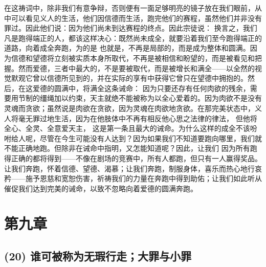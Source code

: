 在这祷词中，除非我们有意争辩，否则便有一面足够明亮的镜子放在我们眼前，从中可以看见义人的生活，他们因信德而生活，跑完他们的赛程，虽然他们并非没有罪过。因此他们说：因为他们尚未到达赛程的终点。因此宗徒说： 换言之，我们凡是跑得端正的人，都该这样决心：既然尚未成全，就要沿着我们至今跑得端正的道路，向着成全奔跑，为的是 也就是，不再是局部的，而是成为整体和圆满。因为信德和望德将立刻被实质本身所取代，不再是被相信和盼望的，而是被看见和把握。然而爱德，三者中最大的，不是要被取代，而是被增长和满全——以全然的视觉默观它曾以信德所见到的，并在实际的享有中获得它曾只在望德中拥抱的。然后，在这爱德的圆满中，将满全这条诫命： 因为只要还存有任何肉欲的残余，需要用节制的缰绳加以约束，天主就绝不能被称为以全心爱着的。因为肉欲不是没有灵魂而贪欲；虽然说是肉欲在贪欲，因为灵魂在肉欲地贪欲。在那完美状态中，义人将毫无罪过地生活，因为在他肢体中不再有相反他心思之法律的律法， 但他将全心、全灵、全意爱天主， 这是第一条且最大的诫命。为什么这样的成全不该吩咐给人呢，尽管在今生可能没有人达到？因为如果我们不知道要跑向哪里，我们就不能正确地跑。但除非在诫命中指明，又怎能知道呢？因此，让我们 因为所有跑得正确的都将得到——不像在剧场的竞赛中，所有人都跑，但只有一人赢得奖品。 让我们奔跑，怀着信德、望德、渴慕；让我们奔跑，制服身体，喜乐而热心地行哀矜——施予恩慈和宽恕伤害，祈祷我们的力量在奔跑中得到助佑；让我们如此听从催促我们达到完美的诫命，以致不忽略向着爱德的圆满奔跑。\par


\section{第九章}


\subsection{(20) 谁可被称为无瑕行走；大罪与小罪}


